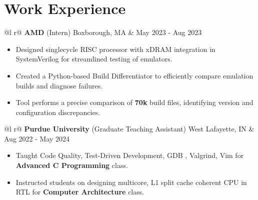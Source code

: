 \documentclass[a4paper,10pt]{article}
\begin{document}
\section{Work Experience}

\begin{tabularx}{\linewidth}{ @{}l r@{} }
    \textbf{AMD} (Intern) Boxborough, MA & \hfill {\small May 2023 - Aug 2023} \\[2.75pt]
    {
        \begin{minipage}[t]{\linewidth}
            \begin{itemize}[nosep,after=\strut, leftmargin=2em, itemsep=3pt]
                \item Designed singlecycle RISC processor with xDRAM integration in SystemVerilog for streamlined testing of emulators.
                \item Created a Python-based Build Differentiator to efficiently compare emulation builds and diagnose failures.
                \item Tool performs a precise comparison of \textbf{70k} build files, identifying version and configuration discrepancies.
            \end{itemize}
        \end{minipage}
    }
\end{tabularx}
\vspace{0.1cm}

\begin{tabularx}{\linewidth}{ @{}l r@{} }
    \textbf{Purdue University} (Graduate Teaching Assistant) West Lafayette, IN & \hfill {\small Aug 2022 - May 2024} \\[2.75pt]
    {
        \begin{minipage}[t]{\linewidth}
            \begin{itemize}[nosep,after=\strut, leftmargin=2em, itemsep=3pt]
                \item Taught Code Quality, Test-Driven Development, GDB , Valgrind, Vim for \textbf{Advanced C Programming} class.
                \item Instructed students on designing multicore, L1 split cache coherent CPU in RTL for \textbf{Computer Architecture} class.     
            \end{itemize}
        \end{minipage}
    }  
\end{tabularx}
\vspace{0.1cm}
\end{document}
